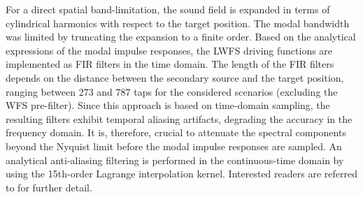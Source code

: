 For a direct spatial band-limitation,
the sound field is expanded in terms of cylindrical harmonics with respect to the target position.
The modal bandwidth was limited by truncating the expansion to a finite order.
Based on the analytical expressions of the modal impulse responses,
the LWFS driving functions are implemented as FIR filters in the time domain.
The length of the FIR filters depends on the distance between the secondary source and the target position,
ranging between 273 and 787 taps for the considered scenarios
(excluding the WFS pre-filter).
%
Since this approach is based on time-domain sampling,
the resulting filters exhibit temporal aliasing artifacts,
degrading the accuracy in the frequency domain.
It is, therefore, crucial to attenuate the spectral components beyond the Nyquist limit
before the modal impulse responses are sampled.
An analytical anti-aliasing filtering is performed in the continuous-time domain
by using the 15th-order Lagrange interpolation kernel.
%
Interested readers are referred to \cite{hahn2022cylindrical} for further detail.
